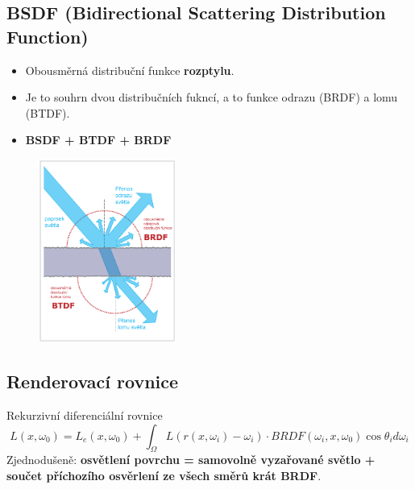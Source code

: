 \subsection{BSDF (Bidirectional Scattering Distribution Function)}
\begin{itemize}
	\item Obousměrná distribuční funkce \textbf{rozptylu}.
	\item Je to souhrn dvou distribučních fukncí, a to funkce odrazu (BRDF) a lomu (BTDF).
	\item \textbf{BSDF + BTDF + BRDF}
\end{itemize}
\begin{figure}[H]
\centering
\includegraphics[width=0.4\textwidth]{assets/6_bsdf}
\end{figure}


\subsection{Renderovací rovnice}
Rekurzivní diferenciální rovnice
\begin{equation*}
	L(x, \omega_0) = L_e(x,\omega_0) + \int_{\Omega} L(r(x,\omega_i) - \omega_i) \cdot BRDF(\omega_i,x,\omega_0) \cos{\theta_id\omega_i}
\end{equation*}
Zjednodušeně: \textbf{osvětlení povrchu = samovolně vyzařované světlo + součet příchozího osvěrlení ze všech směrů krát BRDF}.